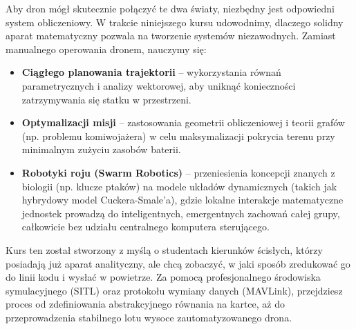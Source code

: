 Aby dron mógł skutecznie połączyć te dwa światy, niezbędny jest odpowiedni system obliczeniowy. W trakcie niniejszego kursu udowodnimy, dlaczego solidny aparat matematyczny pozwala na tworzenie systemów niezawodnych. Zamiast manualnego operowania dronem, nauczymy się:

\begin{itemize}
    \item \textbf{Ciągłego planowania trajektorii} -- wykorzystania równań parametrycznych i analizy wektorowej, aby uniknąć konieczności zatrzymywania się statku w przestrzeni.
    \item \textbf{Optymalizacji misji} -- zastosowania geometrii obliczeniowej i teorii grafów (np. problemu komiwojażera) w celu maksymalizacji pokrycia terenu przy minimalnym zużyciu zasobów baterii.
    \item \textbf{Robotyki roju (Swarm Robotics)} -- przeniesienia koncepcji znanych z biologii (np. klucze ptaków) na modele układów dynamicznych (takich jak hybrydowy model Cuckera-Smale'a), gdzie lokalne interakcje matematyczne jednostek prowadzą do inteligentnych, emergentnych zachowań całej grupy, całkowicie bez udziału centralnego komputera sterującego.
\end{itemize}

Kurs ten został stworzony z myślą o studentach kierunków ścisłych, którzy posiadają już aparat analityczny, ale chcą zobaczyć, w jaki sposób zredukować go do linii kodu i wysłać w powietrze. Za pomocą profesjonalnego środowiska symulacyjnego (SITL) oraz protokołu wymiany danych (MAVLink), przejdziesz proces od zdefiniowania abstrakcyjnego równania na kartce, aż do przeprowadzenia stabilnego lotu wysoce zautomatyzowanego drona.